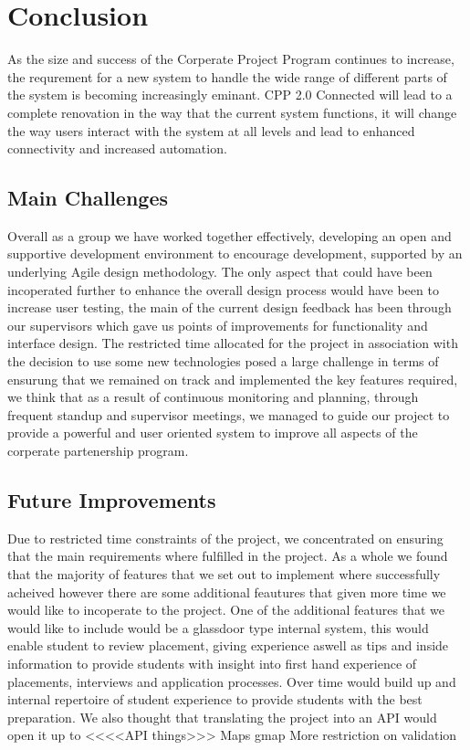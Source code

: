 \section{Conclusion}
As the size and success of the Corperate Project Program continues to increase, the requrement for a new system to handle the wide range of different parts of the system is becoming increasingly eminant. CPP 2.0 Connected will lead to a complete renovation in the way that the current system functions, it will change the way users interact with the system at all levels and lead to enhanced connectivity and increased automation.
	
	\subsection{Main Challenges}
		Overall as a group we have worked together effectively, developing an open and supportive development environment to encourage development, supported by an underlying Agile design methodology. The only aspect that could have been incoperated further to enhance the overall design process would have been to increase user testing, the main of the current design feedback has been through our supervisors which gave us points of improvements for functionality and interface design.
		The restricted time allocated for the project in association with the decision to use some new technologies posed a large challenge in terms of ensurung that we remained on track and implemented the key features required, we think that as a result of continuous monitoring and planning, through frequent standup and supervisor meetings, we managed to guide our project to provide a powerful and user oriented system to improve all aspects of the corperate partenership program. 
	
	\subsection{Future Improvements}
		Due to restricted time constraints of the project, we concentrated on ensuring that the main requirements where fulfilled in the project. As a whole we found that the majority of features that we set out to implement where successfully acheived however there are some additional feautures that given more time we would like to incoperate to the project. 
		One of the additional features that we would like to include would be a glassdoor type internal system, this would enable student to review placement, giving experience aswell as tips and inside information to provide students with insight into first hand experience of placements, interviews and application processes. Over time would build up and internal repertoire of student experience to provide students with the best preparation.
		We also thought that translating the project into an API would open it up to <<<<API things>>>
		Maps gmap
		More restriction on validation

